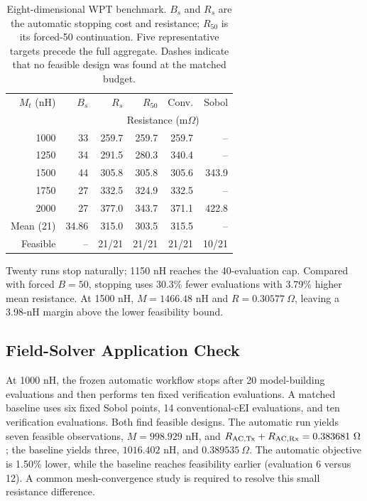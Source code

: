 \documentclass[10pt,conference,letterpaper]{IEEEtran}
\begin{document}
\begin{table}[!t]
\caption{Eight-dimensional WPT benchmark. $B_s$ and $R_s$ are the automatic stopping cost and resistance; $R_{50}$ is its forced-50 continuation. Five representative targets precede the full aggregate. Dashes indicate that no feasible design was found at the matched budget.}
\label{tab:wpt}
\centering
\scriptsize
\begin{tabular}{@{}rrrrrr@{}}
\toprule
$M_t$ (nH) & $B_s$ & $R_s$ & $R_{50}$ & Conv. & Sobol \\
& & \multicolumn{4}{c}{Resistance (m$\Omega$)} \\
\midrule
1000 & 33 & 259.7 & 259.7 & 259.7 & -- \\
1250 & 34 & 291.5 & 280.3 & 340.4 & -- \\
1500 & 44 & 305.8 & 305.8 & 305.6 & 343.9 \\
1750 & 27 & 332.5 & 324.9 & 332.5 & -- \\
2000 & 27 & 377.0 & 343.7 & 371.1 & 422.8 \\
\midrule
Mean (21) & 34.86 & 315.0 & 303.5 & 315.5 & -- \\
Feasible & -- & 21/21 & 21/21 & 21/21 & 10/21 \\
\bottomrule
\end{tabular}
\end{table}

Twenty runs stop naturally; 1150 nH reaches the 40-evaluation cap. Compared with forced $B=50$, stopping uses 30.3\% fewer evaluations with 3.79\% higher mean resistance. At 1500 nH, $M=1466.48$ nH and $R=0.30577\ \Omega$, leaving a 3.98-nH margin above the lower feasibility bound.

\subsection{Field-Solver Application Check}
At 1000 nH, the frozen automatic workflow stops after 20 model-building evaluations and then performs ten fixed verification evaluations. A matched baseline uses six fixed Sobol points, 14 conventional-cEI evaluations, and ten verification evaluations. Both find feasible designs. The automatic run yields seven feasible observations, $M=998.929$ nH, and $R_{\rm AC,Tx}+R_{\rm AC,Rx}=0.383681\ \Omega$; the baseline yields three, $1016.402$ nH, and $0.389535\ \Omega$. The automatic objective is 1.50\% lower, while the baseline reaches feasibility earlier (evaluation 6 versus 12). A common mesh-convergence study is required to resolve this small resistance difference.
\end{document}
